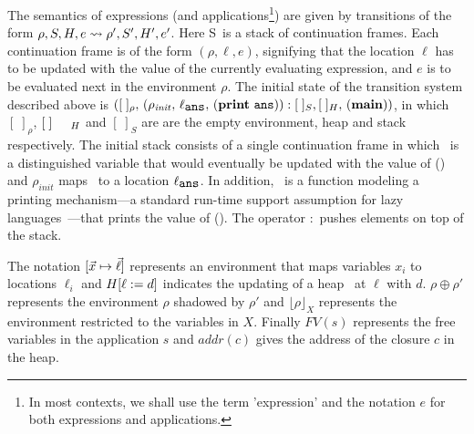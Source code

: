 \documentclass[preprint,9pt]{sigplanconf}
\newcommand{\warning}[1]{{\color{Myred}{#1}}}
\def\myvec{\mathaccent"017E }
\newcommand{\stk}{{S}}
\begin{document}
The  semantics  of   expressions  (and  applications\footnote{In  most
 contexts, we  shall use the  term 'expression' and the  notation $e$
  for both expressions and applications.}) 
are given by transitions of the form $\rho, \stk, \heap, e \rightsquigarrow
\rho',  \stk', \heap',  e'$.  Here  \stk\ is  a stack  of continuation
frames.  Each  continuation frame  is of the  form $(\rho,  \ell, e)$,
signifying that the  location $\ell$ has to be updated  with the value
of the  currently evaluating  expression, and $e$  is to  be evaluated
next  in the  environment $\rho$.  
The  initial  state  of  the  transition  system  described  above  is
$([\;]_\rho,\,   (\rho_\mathit{init},   \, \ell_{\mathbf{\mbox{\tt ans}}}  ,\,
(\mathbf{print}~\mathbf{\mbox{\tt ans}})):[\;]_{S}, 
[\;]_{H},\, (\mathbf{main}))$,  in which  $[\;]_\rho$,
$[\;]_{\mbox \footnotesize {H}}$
and $[\;]_{S}$ are    are the
empty environment, heap and stack respectively. The  initial stack consists
of  a single  continuation frame  in  which \ans\  is a  distinguished
variable  that  would   eventually  be  updated  with   the  value  of
(\mainpgm) and $\rho_\mathit{init}$ maps \ans\ to a location $\ell_{\mathbf{\mbox{\tt ans}}}$.   In  addition, \print\ is  a function modeling  a printing
mechanism---a   standard   run-time   support  assumption   for   lazy
languages~\cite{Jones87}---that prints  the value of  (\mainpgm).  The operator $:$
pushes elements on top of the stack.

The   notation  $[\myvec{x}   \mapsto  \myvec{\ell}]$   represents  an
environment  that  maps  variables  $x_i$ to  locations  $\ell_i$  and
$H[\ell := d]$  indicates the updating of a heap  \heap\ at $\ell$
with  $d$.   $\rho \oplus  \rho'$  represents  the environment  $\rho$
shadowed  by  $\rho'$  and  $\lfloor \rho  \rfloor_X$  represents  the
environment  restricted  to  the  variables in  $X$.  Finally  $FV(s)$
represents the  free variables  in the  application $s$  and $addr(c)$
gives the address of the closure $c$ in the heap.
\end{document}

